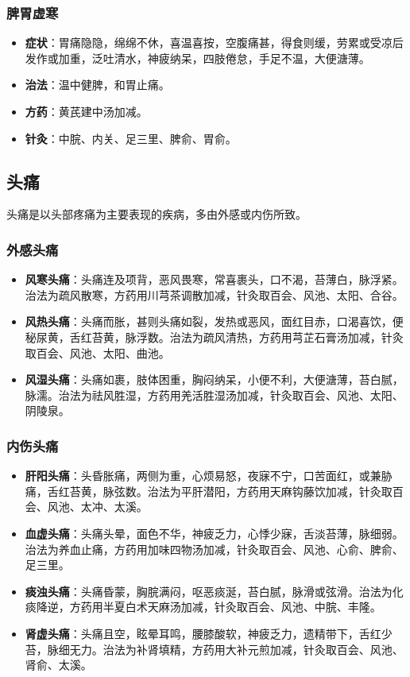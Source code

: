 \documentclass[12pt,UTF8]{ctexbook}
\begin{document}
\subsubsection{脾胃虚寒}

\begin{itemize}
\item \textbf{症状}：胃痛隐隐，绵绵不休，喜温喜按，空腹痛甚，得食则缓，劳累或受凉后发作或加重，泛吐清水，神疲纳呆，四肢倦怠，手足不温，大便溏薄。
\item \textbf{治法}：温中健脾，和胃止痛。
\item \textbf{方药}：黄芪建中汤加减。
\item \textbf{针灸}：中脘、内关、足三里、脾俞、胃俞。
\end{itemize}

\subsection{头痛}

头痛是以头部疼痛为主要表现的疾病，多由外感或内伤所致。

\subsubsection{外感头痛}

\begin{itemize}
\item \textbf{风寒头痛}：头痛连及项背，恶风畏寒，常喜裹头，口不渴，苔薄白，脉浮紧。治法为疏风散寒，方药用川芎茶调散加减，针灸取百会、风池、太阳、合谷。
\item \textbf{风热头痛}：头痛而胀，甚则头痛如裂，发热或恶风，面红目赤，口渴喜饮，便秘尿黄，舌红苔黄，脉浮数。治法为疏风清热，方药用芎芷石膏汤加减，针灸取百会、风池、太阳、曲池。
\item \textbf{风湿头痛}：头痛如裹，肢体困重，胸闷纳呆，小便不利，大便溏薄，苔白腻，脉濡。治法为祛风胜湿，方药用羌活胜湿汤加减，针灸取百会、风池、太阳、阴陵泉。
\end{itemize}

\subsubsection{内伤头痛}

\begin{itemize}
\item \textbf{肝阳头痛}：头昏胀痛，两侧为重，心烦易怒，夜寐不宁，口苦面红，或兼胁痛，舌红苔黄，脉弦数。治法为平肝潜阳，方药用天麻钩藤饮加减，针灸取百会、风池、太冲、太溪。
\item \textbf{血虚头痛}：头痛头晕，面色不华，神疲乏力，心悸少寐，舌淡苔薄，脉细弱。治法为养血止痛，方药用加味四物汤加减，针灸取百会、风池、心俞、脾俞、足三里。
\item \textbf{痰浊头痛}：头痛昏蒙，胸脘满闷，呕恶痰涎，苔白腻，脉滑或弦滑。治法为化痰降逆，方药用半夏白术天麻汤加减，针灸取百会、风池、中脘、丰隆。
\item \textbf{肾虚头痛}：头痛且空，眩晕耳鸣，腰膝酸软，神疲乏力，遗精带下，舌红少苔，脉细无力。治法为补肾填精，方药用大补元煎加减，针灸取百会、风池、肾俞、太溪。
\end{itemize}
\end{document}
